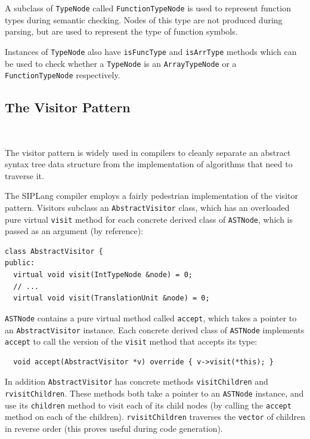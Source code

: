 \documentclass[11pt,a4paper]{scrartcl}
\begin{document}
A subclass of \verb!TypeNode! called \verb!FunctionTypeNode! is used to represent function types during semantic checking. Nodes of this type are not produced during parsing, but are used to represent the type of function symbols.

Instances of \verb!TypeNode! also have \verb!isFuncType! and \verb!isArrType! methods which can be used to check whether a \verb!TypeNode! is an \verb!ArrayTypeNode! or a \verb!FunctionTypeNode! respectively.

\subsection{The Visitor Pattern}~\label{sec:visitor}

The visitor pattern is widely used in compilers to cleanly separate an abstract syntax tree data structure from the implementation of algorithms that need to traverse it.

The SIPLang compiler employs a fairly pedestrian implementation of the visitor pattern. Visitors subclass an \verb!AbstractVisitor! class, which has an overloaded pure virtual \verb!visit! method for each concrete derived class of \verb!ASTNode!, which is passed as an argument (by reference):

\begin{verbatim}
class AbstractVisitor {
public:
  virtual void visit(IntTypeNode &node) = 0;
  // ...
  virtual void visit(TranslationUnit &node) = 0;
\end{verbatim}

\verb!ASTNode! contains a pure virtual method called \verb!accept!, which takes a pointer to an \verb!AbstractVisitor! instance. Each concrete derived class of \verb!ASTNode! implements \verb!accept! to call the version of the \verb!visit! method that accepts its type:

\begin{verbatim}
  void accept(AbstractVisitor *v) override { v->visit(*this); }
\end{verbatim}

In addition \verb!AbstractVisitor! has concrete methods \verb!visitChildren! and \verb!rvisitChildren!. These methods both take a pointer to an \verb!ASTNode! instance, and use its \verb!children! method to visit each of its child nodes (by calling the \verb!accept! method on each of the children). \verb!rvisitChildren! traverses the \verb!vector! of children in reverse order (this proves useful during code generation).
\end{document}
